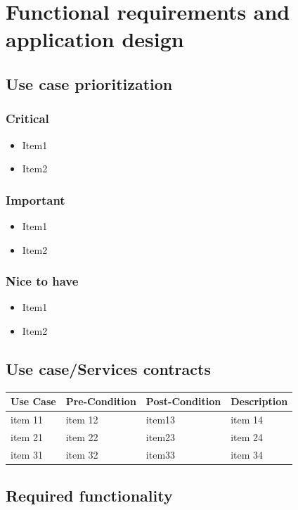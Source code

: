 \documentclass[a4paper,10pt]{article}
\begin{document}
\section{Functional requirements and application design}
\subsection{Use case prioritization}
\subsubsection{Critical}
\begin{itemize}
\item Item1
\item Item2
\end{itemize}

\subsubsection{Important}
\begin{itemize}
\item Item1
\item Item2
\end{itemize}

\subsubsection{Nice to have}
\begin{itemize}
\item Item1
\item Item2
\end{itemize}

\subsection{Use case/Services contracts}
\begin{tabu} to \textwidth { | X[l] | X[l] | X[l] | X[l] | }
	\hline
		Use Case		& Pre-Condition		& Post-Condition		& Description	\\ \hline \hline
		item 11		& item 12			& item13				& item 14  \\ \hline
		item 21		& item 22			& item23				& item 24  \\ \hline
		item 31		& item 32			& item33				& item 34  \\
	\hline
\end{tabu}

\subsection{Required functionality}
\end{document}
